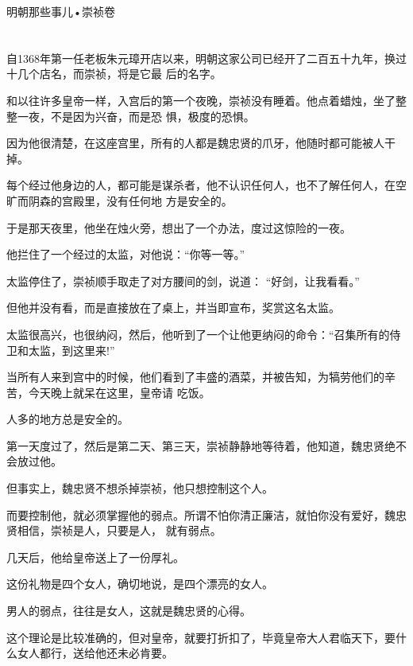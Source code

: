 \documentclass[11pt,a4paper,onecolumn]{article}
\begin{document}
\setcounter{section}{1541}
\pagestyle{fancy}

\newcommand{\myrule}{\rule[3pt]{1.6em}{0.4mm}}

\begin{center}
{\Large 明朝那些事儿•崇祯卷}
\end{center}

\section[\thesection]{}

自1368年第一任老板朱元璋开店以来，明朝这家公司已经开了二百五十九年，换过十几个店名，而崇祯，将是它最
后的名字。

和以往许多皇帝一样，入宫后的第一个夜晚，崇祯没有睡着。他点着蜡烛，坐了整整一夜，不是因为兴奋，而是恐
惧，极度的恐惧。

因为他很清楚，在这座宫里，所有的人都是魏忠贤的爪牙，他随时都可能被人干掉。

每个经过他身边的人，都可能是谋杀者，他不认识任何人，也不了解任何人，在空旷而阴森的宫殿里，没有任何地
方是安全的。

于是那天夜里，他坐在烛火旁，想出了一个办法，度过这惊险的一夜。

他拦住了一个经过的太监，对他说：``你等一等。''

太监停住了，崇祯顺手取走了对方腰间的剑，说道： ``好剑，让我看看。''

但他并没有看，而是直接放在了桌上，并当即宣布，奖赏这名太监。

太监很高兴，也很纳闷，然后，他听到了一个让他更纳闷的命令：``召集所有的侍卫和太监，到这里来!''

当所有人来到宫中的时候，他们看到了丰盛的酒菜，并被告知，为犒劳他们的辛苦，今天晚上就呆在这里，皇帝请
吃饭。

人多的地方总是安全的。

第一天度过了，然后是第二天、第三天，崇祯静静地等待着，他知道，魏忠贤绝不会放过他。

但事实上，魏忠贤不想杀掉崇祯，他只想控制这个人。

而要控制他，就必须掌握他的弱点。所谓不怕你清正廉洁，就怕你没有爱好，魏忠贤相信，崇祯是人，只要是人，
就有弱点。

几天后，他给皇帝送上了一份厚礼。

这份礼物是四个女人，确切地说，是四个漂亮的女人。

男人的弱点，往往是女人，这就是魏忠贤的心得。

这个理论是比较准确的，但对皇帝，就要打折扣了，毕竟皇帝大人君临天下，要什么女人都行，送给他还未必肯要。
\end{document}
